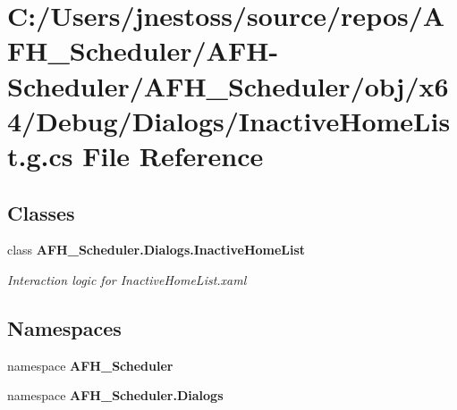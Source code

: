 \section{C\+:/\+Users/jnestoss/source/repos/\+A\+F\+H\+\_\+\+Scheduler/\+A\+F\+H-\/\+Scheduler/\+A\+F\+H\+\_\+\+Scheduler/obj/x64/\+Debug/\+Dialogs/\+Inactive\+Home\+List.g.\+cs File Reference}
\label{x64_2_debug_2_dialogs_2_inactive_home_list_8g_8cs}
\subsection*{Classes}
\begin{DoxyCompactItemize}
\item 
class \textbf{ A\+F\+H\+\_\+\+Scheduler.\+Dialogs.\+Inactive\+Home\+List}
\begin{DoxyCompactList}\small\item\em Interaction logic for Inactive\+Home\+List.\+xaml \end{DoxyCompactList}\end{DoxyCompactItemize}
\subsection*{Namespaces}
\begin{DoxyCompactItemize}
\item 
namespace \textbf{ A\+F\+H\+\_\+\+Scheduler}
\item 
namespace \textbf{ A\+F\+H\+\_\+\+Scheduler.\+Dialogs}
\end{DoxyCompactItemize}
